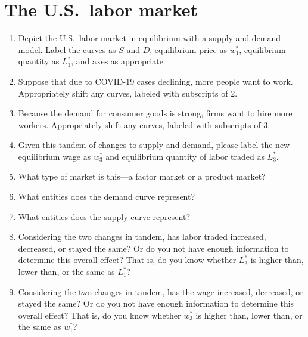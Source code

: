 \documentclass[
    letterpaper,paper=portrait,fleqn,
    DIV=16,fontsize=12pt,twoside=semi,
    parskip=full-,
    headings=standardclasses]
{scrartcl}
\begin{document}
\section{The U.S.~labor market}

\begin{center}
\vspace{18pt}
\end{center}

\begin{enumerate}

\item Depict the U.S.~labor market in equilibrium with a supply and demand model. Label the curves as $S$ and $D$, equilibrium price as $w^*_1$, equilibrium quantity as $L^*_1$, and axes as appropriate.

\item Suppose that due to COVID-19 cases declining, more people want to work. Appropriately shift any curves, labeled with subscripts of 2.

\item Because the demand for consumer goods is strong, firms want to hire more workers. Appropriately shift any curves, labeled with subscripts of 3.

\item Given this tandem of changes to supply and demand, please label the new equilibrium wage as $w^*_3$ and equilibrium quantity of labor traded as $L^*_3$.

\clearpage

\item What type of market is this---a factor market or a product market?

\vfill

\item What entities does the demand curve represent?

\vfill

\item What entities does the supply curve represent?

\vfill

\item Considering the two changes in tandem, has labor traded increased, decreased, or stayed the same? Or do you not have enough information to determine this overall effect? That is, do you know whether $L^*_3$ is higher than, lower than, or the same as $L^*_1$?

\vfill

\item Considering the two changes in tandem, has the wage increased, decreased, or stayed the same? Or do you not have enough information to determine this overall effect? That is, do you know whether $w^*_3$ is higher than, lower than, or the same as $w^*_1$?

\vfill

\end{enumerate}
\end{document}
